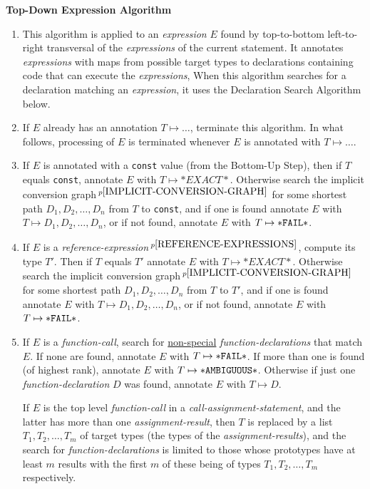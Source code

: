 \documentclass[12pt]{article}
\newcommand{\pagnote}[1]{$\,^{p\pageref{#1}}$}
\begin{document}
\centerline{\bf Top-Down Expression Algorithm}
\begin{enumerate}

\item This algorithm is applied to an {\em expression} $E$ found by
top-to-bottom left-to-right transversal of the {\em expressions} of the
current statement.  It annotates {\em expressions} with maps from
possible target types to declarations containing code that can execute
the {\em expressions},
When this algorithm searches for a declaration matching an {\em expression},
it uses the Declaration Search Algorithm below.

\item If $E$ already has an annotation $T\mapsto \ldots$,
terminate this algorithm.  In what follows, processing of $E$ is
terminated whenever $E$ is annotated with $T\mapsto \ldots$.

\item If $E$ is annotated with a {\tt const} value
(from the Bottom-Up Step), then if $T$ equals {\tt const},
annotate $E$ with $T\mapsto{*EXACT*}$.
Otherwise search the implicit conversion
graph\pagnote{IMPLICIT-CONVERSION-GRAPH}
for some shortest path $D_1,D_2,\ldots,D_n$ from $T$ to {\tt const},
and if one is found annotate $E$ with $T\mapsto D_1,D_2,\ldots,D_n$,
or if not found,
annotate $E$ with $T\mapsto {\tt *FAIL*}$.

\item If $E$ is a
{\em reference-expression}\pagnote{REFERENCE-EXPRESSIONS},
compute its type $T'$. 
Then if $T$ equals $T'$ annotate $E$ with $T\mapsto{*EXACT*}$.
Otherwise search the implicit conversion
graph\pagnote{IMPLICIT-CONVERSION-GRAPH}
for some shortest path $D_1,D_2,\ldots,D_n$ from $T$ to $T'$,
and if one is found annotate $E$ with $T\mapsto D_1,D_2,\ldots,D_n$,
or if not found,
annotate $E$ with $T\mapsto {\tt *FAIL*}$.

\item If $E$ is a {\em function-call}, search for \underline{non-special}
{\em function-declarations}
that match $E$.
If none are found,
annotate $E$ with $T\mapsto{\tt *FAIL*}$.
If more than one is found (of highest rank),
annotate $E$ with $T\mapsto{\tt *AMBIGUOUS*}$.
Otherwise if just one {\em function-declaration} $D$ was found,
annotate $E$ with $T\mapsto D$.

If $E$ is the top level {\em function-call}
in a {\em call-assignment-statement}, and the latter has
more than one {\em assignment-result}, then $T$ is replaced by a list
$T_1,T_2,\ldots,T_m$ of target types (the types of the
{\em assignment-results}), and the search for
{\em function-declarations} is limited to those whose prototypes have
at least $m$ results with the first $m$ of these being of types
$T_1,T_2,\ldots,T_m$ respectively.

\end{enumerate}
\end{document}
